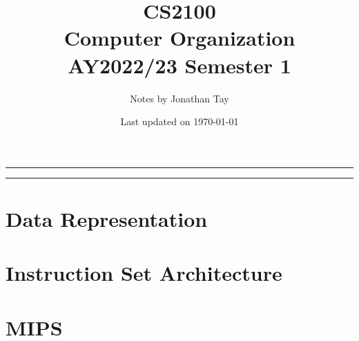 \documentclass[twocolumn]{article}
\title{\vspace{-1cm}\textbf{CS2100 \\[0.25em] Computer Organization} \\[2em] \Large AY2022/23 Semester 1 \\[1em]}
\author{Notes by Jonathan Tay}
\date{Last updated on \today}
\newcommand{\pageline}[1]{\par\noindent\rule{\textwidth}{#1}} %
\begin{document}
    \onecolumn
    \linespread{1.4}\selectfont
    \maketitle
    \pageline{1.5pt}
    \tableofcontents
    \pageline{1.5pt}
    \linespread{1.08}\selectfont
    \twocolumn

    \newpage
        \part{Data Representation}
            
        \part{Instruction Set Architecture}
            
        \part{MIPS}
            
            
            
            
            
\end{document}
